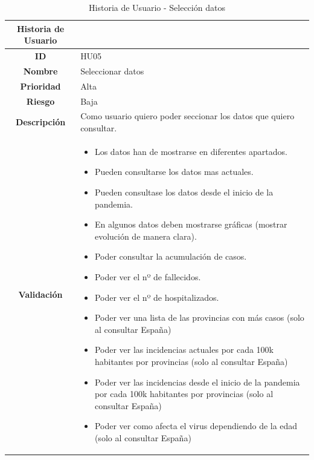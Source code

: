 \begin{table}[H]
	\begin{center}
		\begin{tabular}{| c | p{9cm} |}
			\hline
			
			Historia de Usuario &  \\ \hline
			
			
			\textbf{ID} & HU05 \\
			\textbf{Nombre} & Seleccionar datos \\
			\textbf{Prioridad} & Alta \\
			\textbf{Riesgo} & Baja \\
			\textbf{Descripción} & Como usuario quiero poder seccionar los datos que quiero consultar. \\
			\textbf{Validación} & \begin{itemize}
				\item Los datos han de mostrarse en diferentes apartados.
				\item Pueden consultarse los datos mas actuales.
				\item Pueden consultase los datos desde el inicio de la pandemia.
				\item En algunos datos deben mostrarse gráficas (mostrar evolución de manera clara).
				\item Poder consultar la acumulación de casos.
				\item Poder ver el nº de fallecidos.
				\item Poder ver el nº de hospitalizados.
				\item Poder ver una lista de las provincias con más casos (solo al consultar España)
				\item Poder ver las incidencias actuales por cada 100k habitantes por provincias (solo al consultar España)
				\item Poder ver las incidencias desde el inicio de la pandemia por cada 100k habitantes por provincias (solo al consultar España)
				\item Poder ver como afecta el virus dependiendo de la edad (solo al consultar España)
			\end{itemize} \\ \hline
		\end{tabular}
		\caption{Historia de Usuario - Selección datos}
	\end{center}
\end{table}

